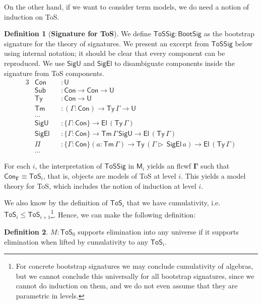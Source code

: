 \documentclass[12pt,a4paper,twoside,openany]{book}
\theoremstyle{remark}
\theoremstyle{definition}
\newtheorem{mydefinition}{Definition}
\theoremstyle{theorem}
\newcommand{\ms}[1]{\mathsf{#1}}
\newcommand{\bs}[1]{\boldsymbol{#1}}
\newcommand{\Con}{\mathsf{Con}}
\newcommand{\Sub}{\mathsf{Sub}}
\newcommand{\Tm}{\mathsf{Tm}}
\newcommand{\Ty}{\mathsf{Ty}}
\newcommand{\U}{\mathsf{U}}
\newcommand{\El}{\mathsf{El}}
\newcommand{\ToS}{\mathsf{ToS}}
\newcommand{\ext}{\triangleright}
\newcommand{\ToSSig}{\mathsf{ToSSig}}
\newcommand{\bGamma}{\bs{\Gamma}}
\newcommand{\bM}{\bs{\mathsf{M}}}
\begin{document}
On the other hand, if we want to consider term models, we do need a notion of
induction on ToS.

\begin{mydefinition}[\textbf{Signature for ToS}]
We define $\ToSSig : \ms{BootSig}$ as the bootstrap signature for the theory of
signatures. We present an excerpt from $\ToSSig$ below using internal notation;
it should be clear that every component can be reproduced. We use $\ms{SigU}$
and $\ms{SigEl}$ to disambiguate components inside the signature from ToS
components.
\begingroup
\allowdisplaybreaks
\begin{alignat*}{3}
  & \Con       &&: \U\\
  & \Sub       &&: \Con \to \Con \to \U\\
  & \Ty        &&: \Con \to \U\\
  & \Tm        &&: (\Gamma : \Con) \to \Ty\,\Gamma \to \U\\
  & ...        &&\\
  & \ms{SigU}  &&: \{\Gamma : \Con\} \to \El\,(\Ty\,\Gamma)\\
  & \ms{SigEl} &&: \{\Gamma : \Con\} \to \Tm\,\Gamma\,\ms{SigU} \to \El\,(\Ty\,\Gamma)\\
  & \Pi        &&: \{\Gamma : \Con\}(a : \Tm\,\Gamma) \to \Ty\,(\Gamma\ext\,\ms{SigEl}\,a)
                   \to \El\,(\Ty\,\Gamma)\\
  & ...        &&
\end{alignat*}
\end{mydefinition}
\endgroup
For each $i$, the interpretation of $\ToSSig$ in $\bM_{i}$ yields an flcwf
$\bGamma$ such that $\Con_{\bGamma} \equiv \ToS_{i}$, that is, objects are
models of ToS at level $i$. This yields a model theory for ToS, which includes
the notion of induction at level $i$.

We also know by the definition of $\ToS_{i}$ that we have cumulativity,
i.e.\ $\ToS_{i} \leq \ToS_{i+1}$\footnote{For concrete bootstrap signatures we
may conclude cumulativity of algebras, but we cannot conclude this universally
for all bootstrap signatures, since we cannot do induction on them, and we do not
even assume that they are parametric in levels.}. Hence, we can make the
following definition:

\begin{mydefinition} $M : \ToS_0$ supports elimination into any universe if
it supports elimination when lifted by cumulativity to any $\ToS_i$.
\end{mydefinition}
\end{document}

